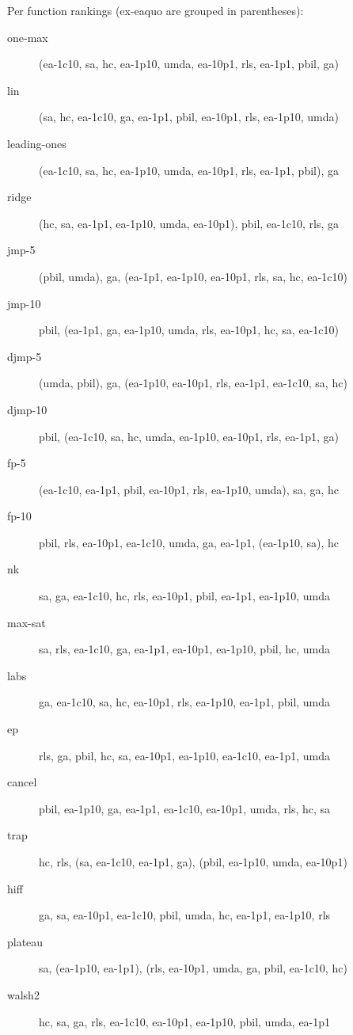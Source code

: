 Per function rankings (ex-eaquo are grouped in parentheses):
\begin{description}
\item[one-max]
(ea-1c10, sa, hc, ea-1p10, umda, ea-10p1, rls, ea-1p1, pbil, ga)

\item[lin]
(sa, hc, ea-1c10, ga, ea-1p1, pbil, ea-10p1, rls, ea-1p10, umda)

\item[leading-ones]
(ea-1c10, sa, hc, ea-1p10, umda, ea-10p1, rls, ea-1p1, pbil), ga

\item[ridge]
(hc, sa, ea-1p1, ea-1p10, umda, ea-10p1), pbil, ea-1c10, rls, ga

\item[jmp-5]
(pbil, umda), ga, (ea-1p1, ea-1p10, ea-10p1, rls, sa, hc, ea-1c10)

\item[jmp-10]
pbil, (ea-1p1, ga, ea-1p10, umda, rls, ea-10p1, hc, sa, ea-1c10)

\item[djmp-5]
(umda, pbil), ga, (ea-1p10, ea-10p1, rls, ea-1p1, ea-1c10, sa, hc)

\item[djmp-10]
pbil, (ea-1c10, sa, hc, umda, ea-1p10, ea-10p1, rls, ea-1p1, ga)

\item[fp-5]
(ea-1c10, ea-1p1, pbil, ea-10p1, rls, ea-1p10, umda), sa, ga, hc

\item[fp-10]
pbil, rls, ea-10p1, ea-1c10, umda, ga, ea-1p1, (ea-1p10, sa), hc

\item[nk]
sa, ga, ea-1c10, hc, rls, ea-10p1, pbil, ea-1p1, ea-1p10, umda

\item[max-sat]
sa, rls, ea-1c10, ga, ea-1p1, ea-10p1, ea-1p10, pbil, hc, umda

\item[labs]
ga, ea-1c10, sa, hc, ea-10p1, rls, ea-1p10, ea-1p1, pbil, umda

\item[ep]
rls, ga, pbil, hc, sa, ea-10p1, ea-1p10, ea-1c10, ea-1p1, umda

\item[cancel]
pbil, ea-1p10, ga, ea-1p1, ea-1c10, ea-10p1, umda, rls, hc, sa

\item[trap]
hc, rls, (sa, ea-1c10, ea-1p1, ga), (pbil, ea-1p10, umda, ea-10p1)

\item[hiff]
ga, sa, ea-10p1, ea-1c10, pbil, umda, hc, ea-1p1, ea-1p10, rls

\item[plateau]
sa, (ea-1p10, ea-1p1), (rls, ea-10p1, umda, ga, pbil, ea-1c10, hc)

\item[walsh2]
hc, sa, ga, rls, ea-1c10, ea-10p1, ea-1p10, pbil, umda, ea-1p1

\end{description}
